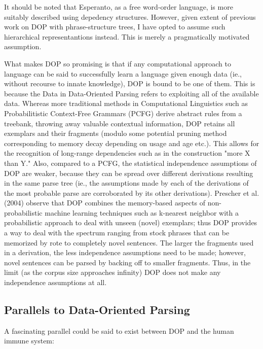 \documentclass[10pt,a4paper]{article}
\begin{document}
It should be noted that Esperanto, as a free word-order language, is more
suitably described using depedency structures. However, given extent of
previous work on DOP with phrase-structure trees, I have opted to assume such
hierarchical representantions instead. This is merely a pragmatically motivated
assumption. 

What makes DOP so promising is that if any computational approach to language
can be said to successfully learn a language given enough data (ie., without
recourse to innate knowledge), DOP is bound to be one of them.  This is because
the Data in Data-Oriented Parsing refers to exploiting all of the available
data. Whereas more traditional methods in Computational Linguistics such as
Probabilitistic Context-Free Grammars (PCFG) derive abstract rules from a
treebank, throwing away valuable contextual information, DOP retains all
exemplars and their fragments (modulo some potential pruning method
corresponding to memory decay depending on usage and age etc.). This allows for
the recognition of long-range dependencies such as in the construction "more X
than Y." Also, compared to a PCFG, the statistical independence assumptions of
DOP are weaker, because they can be spread over different derivations
resulting in the same parse tree (ie., the assumptions made by each of the
derivations of the most probable parse are corroborated by its other
derivations). Prescher et al. (2004) observe that DOP combines the memory-based
aspects of non-probabilistic machine learning techniques such as k-nearest
neighbor with a probabilistic approach to deal with unseen (novel) exemplars;
thus DOP provides a way to deal with the spectrum ranging from stock phrases
that can be memorized by rote to completely novel sentences. The larger the
fragments used in a derivation, the less independence assumptions need to be
made; however, novel sentences can be parsed by backing off to smaller
fragments. Thus, in the limit (as the corpus size approaches infinity) DOP does
not make any independence assumptions at all. 

\subsection{Parallels to Data-Oriented Parsing}

A fascinating parallel could be said to exist between DOP and the human immune
system:
\end{document}
